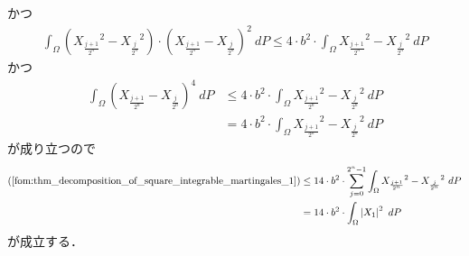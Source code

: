 \begin{sketch}
\begin{description}
				かつ
				\begin{align}
					\int_\Omega \left( {X_{\frac{j+1}{2^n}}}^{2} - {X_{\frac{j}{2^n}}}^{2} \right) \cdot \left(X_{\frac{j+1}{2^n}} - X_{\frac{j}{2^n}}\right)^{2}\ dP
					\leq 4 \cdot b^{2} \cdot \int_\Omega {X_{\frac{j+1}{2^n}}}^{2} - {X_{\frac{j}{2^n}}}^{2}\ dP
				\end{align}
				かつ
				\begin{align}
					\int_\Omega \left(X_{\frac{j+1}{2^n}} - X_{\frac{j}{2^n}}\right)^{4}\ dP
					&\leq 4 \cdot b^{2} \cdot \int_\Omega {X_{\frac{j+1}{2^n}}}^{2} - {X_{\frac{j}{2^n}}}^{2}\ dP \\
					&= 4 \cdot b^{2} \cdot \int_\Omega {X_{\frac{j+1}{2^n}}}^{2} - {X_{\frac{j}{2^n}}}^{2}\ dP
				\end{align}
				が成り立つので
				\begin{align}
					(\refeq{fom:thm_decomposition_of_square_integrable_martingales_1})
					&\leq 14 \cdot b^{2} \cdot \sum_{j=0}^{2^n-1} \int_\Omega {X_{\frac{j+1}{2^n}}}^{2} - {X_{\frac{j}{2^n}}}^{2}\ dP \\
					&= 14 \cdot b^{2} \cdot \int_\Omega \left|X_{1}\right|^{2}\ dP
				\end{align}
				が成立する．
				

\end{description}
\end{sketch}
